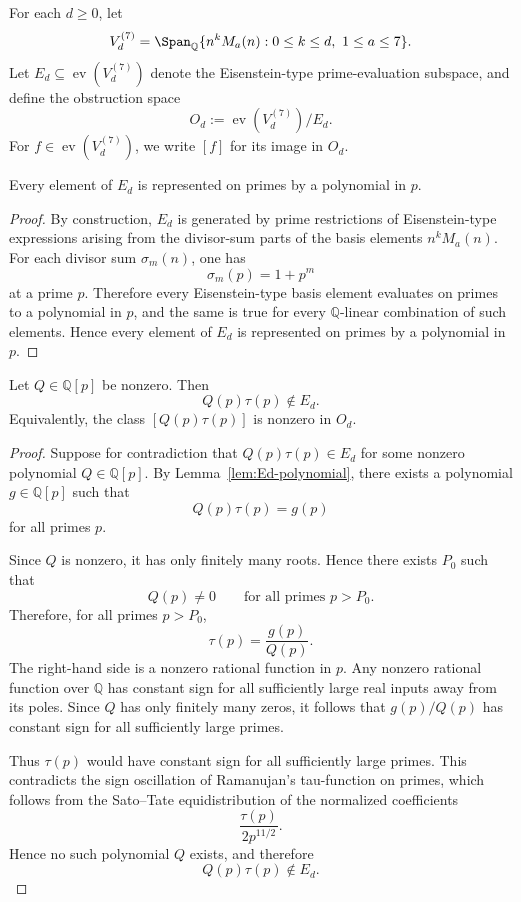 

\begin{definition}
For each $d\ge 0$, let
\[
V_d^{(7)}=\Span_{\mathbb Q}\{n^kM_a(n):0\le k\le d,\ 1\le a\le 7\}.
\]
Let $E_d\subseteq \operatorname{ev}(V_d^{(7)})$ denote the Eisenstein-type prime-evaluation subspace, and define the obstruction space
\[
O_d:=\operatorname{ev}(V_d^{(7)})/E_d.
\]
For $f\in \operatorname{ev}(V_d^{(7)})$, we write $[f]$ for its image in $O_d$.
\end{definition}

\begin{lemma}\label{lem:Ed-polynomial}
Every element of $E_d$ is represented on primes by a polynomial in $p$.
\end{lemma}

\begin{proof}
By construction, $E_d$ is generated by prime restrictions of Eisenstein-type expressions arising from the divisor-sum parts of the basis elements $n^kM_a(n)$. For each divisor sum $\sigma_m(n)$, one has
\[
\sigma_m(p)=1+p^m
\]
at a prime $p$. Therefore every Eisenstein-type basis element evaluates on primes to a polynomial in $p$, and the same is true for every $\mathbb Q$-linear combination of such elements. Hence every element of $E_d$ is represented on primes by a polynomial in $p$.
\end{proof}

\begin{lemma}\label{lem:Qtau-not-in-Ed}
Let $Q\in\mathbb Q[p]$ be nonzero. Then
\[
Q(p)\tau(p)\notin E_d.
\]
Equivalently, the class $[Q(p)\tau(p)]$ is nonzero in $O_d$.
\end{lemma}

\begin{proof}
Suppose for contradiction that $Q(p)\tau(p)\in E_d$ for some nonzero polynomial $Q\in\mathbb Q[p]$. By Lemma~\ref{lem:Ed-polynomial}, there exists a polynomial $g\in\mathbb Q[p]$ such that
\[
Q(p)\tau(p)=g(p)
\]
for all primes $p$.

Since $Q$ is nonzero, it has only finitely many roots. Hence there exists $P_0$ such that
\[
Q(p)\neq 0
\qquad\text{for all primes }p>P_0.
\]
Therefore, for all primes $p>P_0$,
\[
\tau(p)=\frac{g(p)}{Q(p)}.
\]
The right-hand side is a nonzero rational function in $p$. Any nonzero rational function over $\mathbb Q$ has constant sign for all sufficiently large real inputs away from its poles. Since $Q$ has only finitely many zeros, it follows that $g(p)/Q(p)$ has constant sign for all sufficiently large primes.

Thus $\tau(p)$ would have constant sign for all sufficiently large primes. This contradicts the sign oscillation of Ramanujan's tau-function on primes, which follows from the Sato--Tate equidistribution of the normalized coefficients
\[
\frac{\tau(p)}{2p^{11/2}}.
\]
Hence no such polynomial $Q$ exists, and therefore
\[
Q(p)\tau(p)\notin E_d.
\]
\end{proof}

